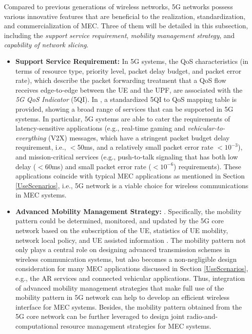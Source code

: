 \documentclass[journal]{IEEEtran}
\begin{document}
{{Compared to previous generations of wireless networks, 5G networks possess various innovative features that are beneficial to the realization, standardization, and commercialization of MEC.  Three of them will be detailed in this subsection, including the \emph{support service requirement}, \emph{mobility management strategy}, and \emph{capability of network slicing}.

\begin{itemize}
\item {\textbf{Support Service Requirement:}} In 5G systems, the QoS characteristics (in terms of resource type, priority level, packet delay budget, and packet error rate), which describe the packet forwarding treatment that a QoS flow receives edge-to-edge between the UE and the UPF, are associated with the \emph{5G QoS Indicator} (5QI). In \cite{3GPPTS23501}, a standardized 5QI to QoS mapping table is provided, showing a broad range of services that can be supported in 5G systems. In particular, 5G systems are able to cater the requirements of latency-sensitive applications (e.g., real-time gaming and \emph{vehicular-to-everything} (V2X) messages, which have a stringent packet budget delay requirement, i.e., $<$50ms, and a relatively small packet error rate $<10^{-3}$), and mission-critical services (e.g., push-to-talk signaling that has both low delay ($<$60ms) and small packet error rate ($<10^{-6}$) requirements). These applications coincide with typical MEC applications as mentioned in Section \ref{UseScenarios}, i.e., 5G network is a viable choice for wireless communications in MEC systems.
\item{\textbf{Advanced Mobility Management Strategy:}} {}. Specifically, the mobility pattern could be determined, monitored, and updated by the 5G core network based on the subscription of the UE, statistics of UE mobility, network local policy, and UE assisted information \cite{3GPPTS23501}. The mobility pattern not only plays a central role on designing advanced transmission schemes in wireless communication systems, but also becomes a non-negligible design consideration for many MEC applications discussed in Section \ref{UseScenarios}, e.g., the AR services and connected vehicular applications. Thus, integration of advanced mobility management strategies that make full use of the mobility pattern in 5G network can help to develop an efficient wireless interface for MEC systems. Besides, the mobility pattern obtained from the 5G core network can be further leveraged to design joint radio-and-computational resource management strategies for MEC systems.

\end{itemize}}}
\end{document}
